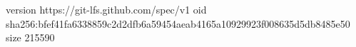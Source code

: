 version https://git-lfs.github.com/spec/v1
oid sha256:bfef41fa6338859c2d2dfb6a59454aeab4165a10929923f008635d5db8485e50
size 215590
